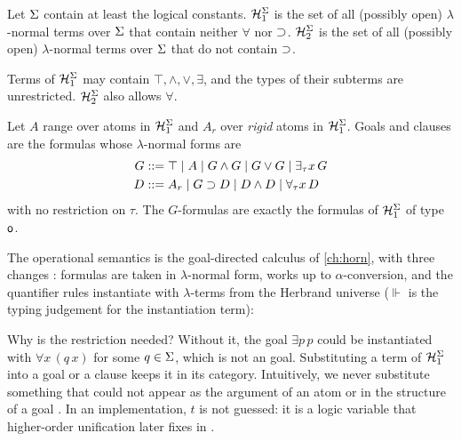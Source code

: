 \begin{definition}\label{def:hoprog-herbrand}
Let $\Sigma$ contain at least the logical constants. $\mathcal{H}_1^\Sigma$ is the set of all (possibly open)
$\lambda$-normal terms over $\Sigma$ that contain neither $\forall$ nor $\supset$. $\mathcal{H}_2^\Sigma$ is the
set of all (possibly open) $\lambda$-normal terms over $\Sigma$ that do not contain $\supset$.
\end{definition}

Terms of $\mathcal{H}_1^\Sigma$ may contain $\top,\wedge,\vee,\exists$, and the types of their subterms are
unrestricted. $\mathcal{H}_2^\Sigma$ also allows $\forall$.

\begin{definition}\label{def:hoprog-hohc}
Let $A$ range over atoms in $\mathcal{H}_1^\Sigma$ and $A_r$ over \emph{rigid} atoms in
$\mathcal{H}_1^\Sigma$. Goals and clauses are the formulas whose $\lambda$-normal forms are
\begin{align*}
G &::= \top \mid A \mid G\wedge G \mid G\vee G \mid \exists_\tau x\,G\\
D &::= A_r \mid G\supset D \mid D\wedge D \mid \forall_\tau x\,D
\end{align*}
with no restriction on $\tau$. The $G$-formulas are exactly the formulas of $\mathcal{H}_1^\Sigma$ of type $\mathsf{o}$.
\end{definition}

The operational semantics is the goal-directed calculus of \cref{ch:horn}, with three
changes : formulas are taken in $\lambda$-normal form,  works up to
$\alpha$-conversion, and the quantifier rules instantiate with $\lambda$-terms from the Herbrand universe
($\Vdash$ is the typing judgement for the instantiation term):
Why is the restriction needed? Without it, the goal $\exists p\,p$ could be instantiated with
$\forall x\,(q\,x)$ for some $q\in\Sigma$, which is not an \hohc{} goal. Substituting a term of
$\mathcal{H}_1^\Sigma$ into a goal or a clause keeps it in its category. Intuitively, we never substitute
something that could not appear as the argument of an atom or in the structure of a goal . In an
implementation, $t$ is not guessed: it is a logic variable that higher-order unification later fixes in
.

